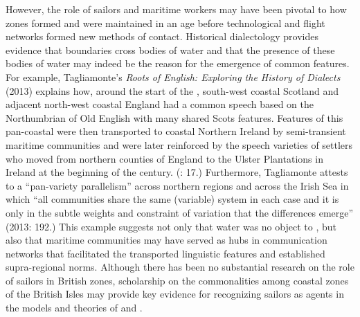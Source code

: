   However, the role of sailors and maritime workers may have been pivotal to how  zones formed and were maintained in an age before technological and flight networks formed new methods of contact. Historical dialectology provides evidence that  boundaries cross bodies of water and that the presence of these bodies of water may indeed be the reason for the emergence of common features. For example, Tagliamonte’s \textit{Roots of English: Exploring the History of Dialects} (2013) explains how, around the start of the , south-west coastal Scotland and adjacent north-west coastal England had a common speech based on the Northumbrian  of Old English with many shared Scots features. Features of this pan-coastal  were then transported to coastal Northern Ireland by semi-transient maritime communities and were later reinforced by the speech varieties of settlers who moved from northern counties of England to the Ulster Plantations in Ireland at the beginning of the century. (\citealt{Tagliamonte2013}: 17.) Furthermore, Tagliamonte attests to a “pan-variety parallelism” across northern regions and across the Irish Sea in which “all communities share the same (variable) system in each case and it is only in the subtle weights and constraint of variation that the differences emerge” (2013: 192.) This example suggests not only that water was no object to , but also that maritime communities may have served as hubs in communication networks that facilitated the transported linguistic features and established supra-regional norms. Although there has been no substantial research on the role of sailors in British  zones, scholarship on the commonalities among coastal zones of the British Isles may provide key evidence for recognizing sailors as agents in the models and theories of  and . 

